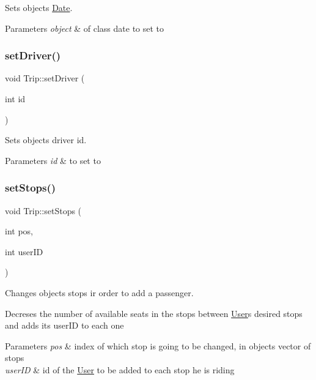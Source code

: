 Sets object\textquotesingle{}s \hyperlink{class_date}{Date}. 


\begin{DoxyParams}{Parameters}
{\em object} & of class date to set to \\
\hline
\end{DoxyParams}
\mbox{\label{group___trip_ga2c5c0c0315b210154ba190a5470ec110}} 
\subsubsection{\texorpdfstring{set\+Driver()}{setDriver()}}
{\footnotesize\ttfamily void Trip\+::set\+Driver (\begin{DoxyParamCaption}\item[{int}]{id }\end{DoxyParamCaption})}



Sets object\textquotesingle{}s driver id. 


\begin{DoxyParams}{Parameters}
{\em id} & to set to \\
\hline
\end{DoxyParams}
\mbox{\label{group___trip_gaa294f1f8844c2b47676e0e985d81b2a0}} 
\subsubsection{\texorpdfstring{set\+Stops()}{setStops()}}
{\footnotesize\ttfamily void Trip\+::set\+Stops (\begin{DoxyParamCaption}\item[{int}]{pos,  }\item[{int}]{user\+ID }\end{DoxyParamCaption})}



Changes object\textquotesingle{}s stops ir order to add a passenger. 

Decreses the number of available seats in the stops between \hyperlink{class_user}{User}\textquotesingle{}s desired stops and adds its user\+ID to each one


\begin{DoxyParams}{Parameters}
{\em pos} & index of which stop is going to be changed, in object\textquotesingle{}s vector of stops \\
\hline
{\em user\+ID} & id of the \hyperlink{class_user}{User} to be added to each stop he is riding \\
\hline
\end{DoxyParams}
\mbox{\label{group___trip_gaadf8ba70a9d5aa210149b5162e402512}} 
